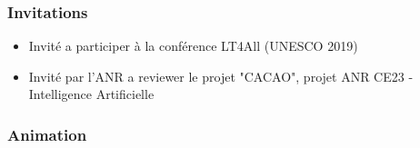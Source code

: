 \documentclass[11pt,a4paper]{article}
\begin{document}
\subsubsection{Invitations}
\begin{itemize}
\item Invité a participer à la conférence LT4All (UNESCO 2019)
\end{itemize}

\begin{itemize}
	\item Invité par l'ANR a reviewer le projet "CACAO", projet ANR CE23 - Intelligence Artificielle
\end{itemize}


\subsubsection{Animation}
\end{document}
